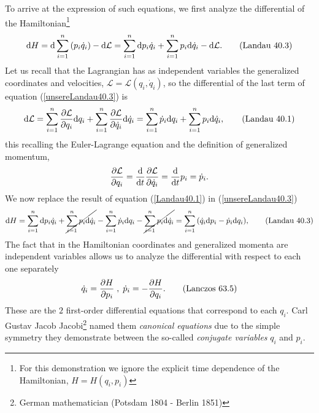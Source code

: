 \documentclass[12pt, english, a4paper]{article}
\begin{document}
To arrive at the expression of such equations, we first analyze the differential of the Hamiltonian\footnote{For this demonstration we ignore the explicit time dependence of the Hamiltonian, \(H=H(q_i, p_i)\)}
\begin{equation}\label{unsereLandau40.3}
	\dd H= \dd \sum_{i=1}^n  \pqty{p_i \dot{q}_i} - \dd \mathcal{L}
	= \sum_{i=1}^n \dd p_i \dot{q}_i+ \sum_{i=1}^n p_i \dd \dot{q}_i - \dd \mathcal{L} .
    \tag{Landau 40.3}
\end{equation}
Let us recall that the Lagrangian has as independent variables the generalized coordinates and velocities, \(\mathcal{L} = \mathcal{L}(q_i, \dot{q}_i)\), so the differential of the last term of equation (\ref{unsereLandau40.3}) is
\begin{equation}\label{Landau40.1}
	\dd \mathcal{L}= \sum_{i=1}^n \pdv{\mathcal{L}}{q_i} \dd q_i+ \sum_{i=1}^n \pdv{\mathcal{L}}{\dot{q}_i} \dd \dot{q}_i
	= \sum_{i=1}^n \dot{p}_i \dd q_i+ \sum_{i=1}^n p_i \dd \dot{q}_i ,
    \tag{Landau 40.1}
\end{equation}
this recalling the Euler-Lagrange equation and the definition of generalized momentum,
\begin{equation}
	\pdv{\mathcal{L}}{q_i}= \dv{t} \pdv{\mathcal{L}}{\dot{q}_i}= \dv{t} p_i= \dot{p}_i .
    \label{alguno}
\end{equation}
We now replace the result of equation (\ref{Landau40.1}) in (\ref{unsereLandau40.3})
\begin{equation}\label{Landau40.3}
	\dd H = \sum_{i=1}^n \dd p_i \dot{q}_i+ \cancel{\sum_{i=1}^n p_i \dd \dot{q}_i} - \sum_{i=1}^n \dot{p}_i \dd q_i - \cancel{\sum_{i=1}^n p_i \dd \dot{q}_i}
	= \sum_{i=1}^n \pqty{ \dot{q}_i \dd p_i - \dot{p}_i \dd q_i } ,
    \tag{Landau 40.3}
\end{equation}
The fact that in the Hamiltonian coordinates and generalized momenta are independent variables allows us to analyze the differential with respect to each one separately
\begin{equation}\label{Lanczos63.5}
	\dot{q}_i= \pdv{H}{p_i}\;,\;\dot{p}_i= -\pdv{H}{q_i}.
    \tag{Lanczos 63.5}
\end{equation}
These are the \(2\) first-order differential equations that correspond to each \(q_i\).
Carl Gustav Jacob Jacobi\footnote{German mathematician (Potsdam 1804 - Berlin 1851)} named them \emph{canonical equations} due to the simple symmetry they demonstrate between the so-called \emph{conjugate variables} \(q_i\) and \(p_i\).
\end{document}

